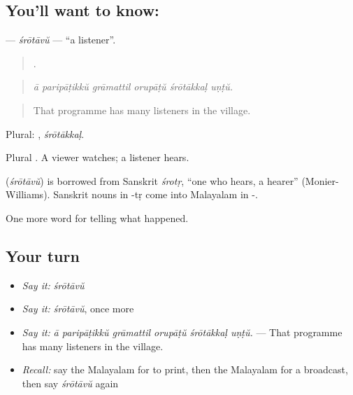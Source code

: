 \subsection*{You'll want to know: }
\textbf{} — \emph{śrōtāvŭ} — \textquotedblleft{}a listener\textquotedblright{}.

\begin{quote}
     .
\end{quote}

\begin{quote}
\emph{ā paripāṭikkŭ grāmattil orupāṭŭ śrōtākkaḷ uṇṭŭ.}
\end{quote}

\begin{quote}
That programme has many listeners in the village.
\end{quote}

Plural: , \emph{śrōtākkaḷ}.

Plural . A viewer watches; a listener hears.

\begin{cousinweb}
\textbf{} (\emph{śrōtāvŭ}) is borrowed from Sanskrit \emph{śrotṛ}, \textquotedblleft{}one who hears, a hearer\textquotedblright{} (Monier-Williams). Sanskrit nouns in -tṛ come into Malayalam in -.
\end{cousinweb}

\begin{grammarlens}[title={What you've built}]
One more word for telling what happened.
\end{grammarlens}

\subsection*{Your turn}
\begin{itemize}
\raggedright
  \item \emph{Say it:} \emph{śrōtāvŭ}
  \item \emph{Say it:} \emph{śrōtāvŭ}, once more
  \item \emph{Say it:} \emph{ā paripāṭikkŭ grāmattil orupāṭŭ śrōtākkaḷ uṇṭŭ.} — That programme has many listeners in the village.
  \item \emph{Recall:} say the Malayalam for to print, then the Malayalam for a broadcast, then say \emph{śrōtāvŭ} again
\end{itemize}

